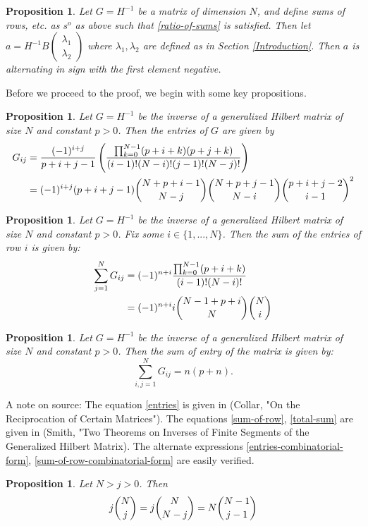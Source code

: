 \documentclass[11pt]{article}
\newtheorem{prop}[thm]{Proposition}
\theoremstyle{definition}
\theoremstyle{remark}
\numberwithin{equation}{section}
\begin{document}
\begin{prop}\label{ratio-of-sums-is-equivalent-to-positivity-of-coefficients}
Let $G=H^{-1}$ be a matrix of dimension $N$, and define sums of rows, etc. as $s^{o}$ as above such that \ref{ratio-of-sums} is satisfied. Then let $a = H^{-1} B \begin{pmatrix} \lambda_1 \\ \lambda_2 \end{pmatrix}$ where $\lambda_1, \lambda_2$ are defined as in Section \ref{Introduction}. Then $a$ is alternating in sign with the first element negative. 
\end{prop}
Before we proceed to the proof, we begin with some key propositions.
\begin{prop}\label{inverse-hilbert-matrix-entry}
Let $G=H^{-1}$ be the inverse of a generalized Hilbert matrix of size $N$ and constant $p>0$. Then the entries of $G$ are given by 
\begin{align}\label{entries}
 G_{ij} &= \frac{(-1)^{i+j}}{p+i+j-1} \left( \frac{\prod_{k=0}^{N-1} (p+i+k)(p+j+k)}{(i-1)! (N-i)! (j-1)! (N-j)!}\right) \\
 &= \label{entries-combinatorial-form} (-1)^{i+j} (p+i+j-1) \dbinom{N+p+i-1}{N-j} \dbinom{N+p+j-1}{N-i} \dbinom{p+i+j-2}{i-1}^2
\end{align}
\end{prop}

\begin{prop}\label{inverse-hilbert-matrix-row}
Let $G=H^{-1}$ be the inverse of a generalized Hilbert matrix of size $N$ and constant $p>0$. Fix some $i \in \{1,...,N\}$. Then the sum of the entries of row $i$ is given by: 
\begin{align}\label{sum-of-row}
\sum_{j=1}^N G_{ij} &= (-1)^{n+i} \frac{\prod_{k=0}^{N-1} (p+i+k)}{(i-1)! (N-i)!} \\
&= (-1)^{n+i} i \dbinom{N-1+p+i}{N} \dbinom{N}{i} \label{sum-of-row-combinatorial-form}
\end{align}
\end{prop}

\begin{prop}\label{inverse-hilbert-matrix-total} 
Let $G=H^{-1}$ be the inverse of a generalized Hilbert matrix of size $N$ and constant $p>0$. Then the sum of entry of the matrix is given by:
\begin{equation}\label{total-sum}
\sum_{i,j=1}^N G_{ij} = n(p+n).
\end{equation}
\end{prop} 
A note on source: The equation \ref{entries} is given in (Collar, "On the Reciprocation of Certain Matrices"). The equations \ref{sum-of-row}, \ref{total-sum} are given in (Smith, "Two Theorems on Inverses of Finite Segments of the Generalized Hilbert Matrix). The alternate expressions \ref{entries-combinatorial-form}, \ref{sum-of-row-combinatorial-form} are easily verified. 
\begin{prop}\label{absorption-combination}
Let $N>j>0$. Then 
\[ j \dbinom{N}{j} = j \dbinom{N}{N-j} = N \dbinom{N-1}{j-1}\]
\end{prop} 
\end{document}
